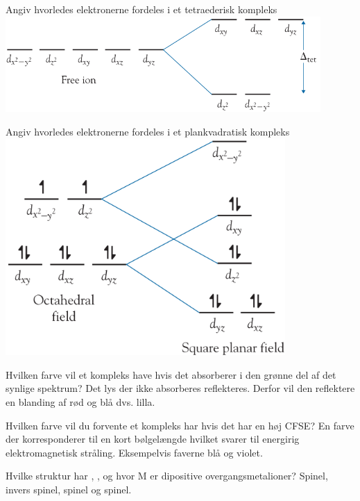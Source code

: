 \begin{flashcard}[Teori]{Angiv hvorledes elektronerne fordeles i et tetraederisk kompleks}
\includegraphics[width=0.9\textwidth]{figures/k19s516motet.png}
\end{flashcard}


\begin{flashcard}[Teori]{Angiv hvorledes elektronerne fordeles i et plankvadratisk kompleks}
\includegraphics[width=0.8\textwidth]{figures/k19s517mopk.png}
\end{flashcard}


\begin{flashcard}[Teori]{Hvilken farve vil et kompleks have hvis det absorberer i den grønne del af det synlige spektrum?}
Det lys der ikke absorberes reflekteres. Derfor vil den reflektere en blanding af rød og blå dvs. lilla.
\end{flashcard}


\begin{flashcard}[Teori]{Hvilken farve vil du forvente et kompleks har hvis det har en høj CFSE?}
En farve der korresponderer til en kort bølgelængde hvilket svarer til energirig elektromagnetisk stråling. Eksempelvis faverne blå og violet.
\end{flashcard}


\begin{flashcard}[Egenskab]{Hvilke struktur har , ,  og  hvor M er dipositive overgangsmetalioner?}
Spinel, invers spinel, spinel og spinel.
\end{flashcard}


